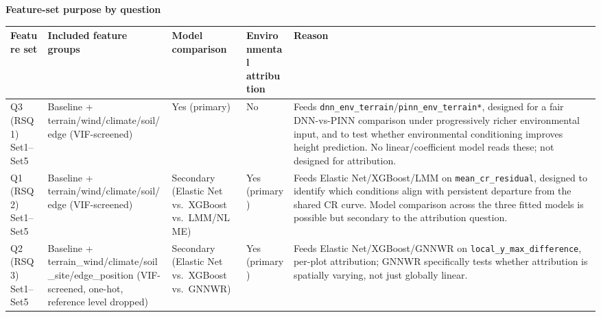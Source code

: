 \documentclass[logo,msc,ai]{infthesis}           %
\begin{document}
\begin{table}[H]
\centering
\textbf{Feature-set purpose by question}\\[4pt]
\scriptsize
\begin{tabularx}{\linewidth}{@{} p{2.6cm} >{\hsize=0.75\hsize\raggedright\arraybackslash}X p{2.1cm} p{1.5cm} >{\hsize=1.25\hsize\raggedright\arraybackslash}X @{}}
\toprule
Feature set & Included feature groups & Model comparison & Environmental attribution & Reason \\
\midrule
Q3 (RSQ1) Set1--Set5 & Baseline + terrain/wind/climate/soil/edge (VIF-screened) & Yes (primary) & No & Feeds \texttt{dnn\_env\_terrain}/\texttt{pinn\_env\_terrain*}, designed for a fair DNN-vs-PINN comparison under progressively richer environmental input, and to test whether environmental conditioning improves height prediction. No linear/coefficient model reads these; not designed for attribution. \\
Q1 (RSQ2) Set1--Set5 & Baseline + terrain/wind/climate/soil/edge (VIF-screened) & Secondary (Elastic Net vs.\ XGBoost vs.\ LMM/NLME) & Yes (primary) & Feeds Elastic Net/XGBoost/LMM on \texttt{mean\_cr\_residual}, designed to identify which conditions align with persistent departure from the shared CR curve. Model comparison across the three fitted models is possible but secondary to the attribution question. \\
Q2 (RSQ3) Set1--Set5 & Baseline + terrain\_wind/climate/soil\_site/edge\_position (VIF-screened, one-hot, reference level dropped) & Secondary (Elastic Net vs.\ XGBoost vs.\ GNNWR) & Yes (primary) & Feeds Elastic Net/XGBoost/GNNWR on \texttt{local\_y\_max\_difference}, per-plot attribution; GNNWR specifically tests whether attribution is spatially varying, not just globally linear. \\

\end{tabularx}
\end{table}
\end{document}
